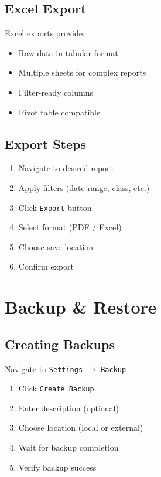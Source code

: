 \documentclass[12pt,a4paper]{report}
\begin{document}
\section{Excel Export}

Excel exports provide:
\begin{itemize}[leftmargin=*]
    \item Raw data in tabular format
    \item Multiple sheets for complex reports
    \item Filter-ready columns
    \item Pivot table compatible
\end{itemize}

\section{Export Steps}

\begin{enumerate}[leftmargin=*]
    \item Navigate to desired report
    \item Apply filters (date range, class, etc.)
    \item Click \texttt{Export} button
    \item Select format (PDF / Excel)
    \item Choose save location
    \item Confirm export
\end{enumerate}

\chapter{Backup \& Restore}

\section{Creating Backups}

Navigate to \texttt{Settings} $\rightarrow$ \texttt{Backup}

\begin{enumerate}[leftmargin=*]
    \item Click \texttt{Create Backup}
    \item Enter description (optional)
    \item Choose location (local or external)
    \item Wait for backup completion
    \item Verify backup success
\end{enumerate}
\end{document}
